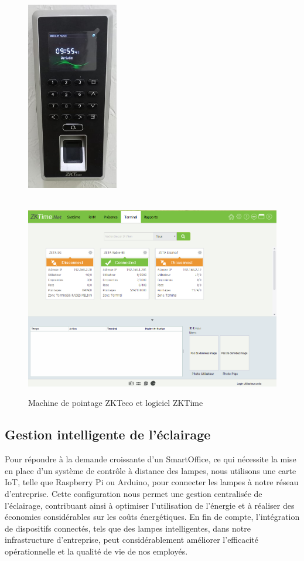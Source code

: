 \begin{figure}[H]
\centering
\includegraphics[height=10cm,width=4cm]{Images/BRades-Pointage.jpg}\includegraphics[width=12cm]{Images/ZKTime.png}
\caption{Machine de pointage ZKTeco et logiciel ZKTime}
\label{Chap4.2.5}
\end{figure}
\smallskip

\subsection{Gestion intelligente de l'éclairage}

Pour répondre à la demande croissante d'un SmartOffice, ce qui nécessite la mise en place d'un système de contrôle à distance des lampes, nous utilisons une carte IoT, telle que Raspberry Pi ou Arduino, pour connecter les lampes à notre réseau d'entreprise. Cette configuration nous permet une gestion centralisée de l'éclairage, contribuant ainsi à optimiser l'utilisation de l'énergie et à réaliser des économies considérables sur les coûts énergétiques. En fin de compte, l'intégration de dispositifs connectés, tels que des lampes intelligentes, dans notre infrastructure d'entreprise, peut considérablement améliorer l'efficacité opérationnelle et la qualité de vie de nos employés.


